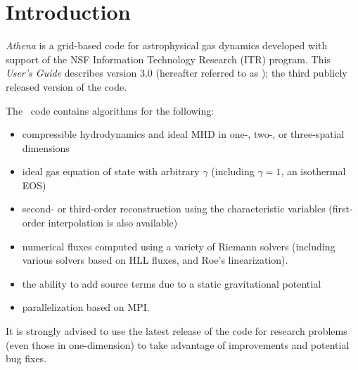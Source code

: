 \section{Introduction}

{\it Athena} is a grid-based code for astrophysical gas dynamics
developed with support of the NSF Information Technology Research (ITR)
program.  This {\it User's Guide} describes version 3.0 (hereafter
referred to as \ath); the third publicly released version of the code.

The \ath\ code contains algorithms for
the following:
\begin{itemize}

\item compressible hydrodynamics and ideal MHD in one-, two-, or three-spatial dimensions

\item ideal gas equation of state with arbitrary $\gamma$ (including 
$\gamma = 1$, an isothermal EOS)

\item second- or third-order reconstruction using the characteristic variables
(first-order interpolation is also available)

\item numerical fluxes computed using a variety of Riemann solvers (including
various solvers based on HLL fluxes, and Roe's linearization).

\item the ability to add source terms due to a static gravitational potential

\item parallelization based on MPI.

\end{itemize}
It is strongly advised to use the latest release of
the code for research problems (even those in one-dimension) to take
advantage of improvements and potential bug fixes.

